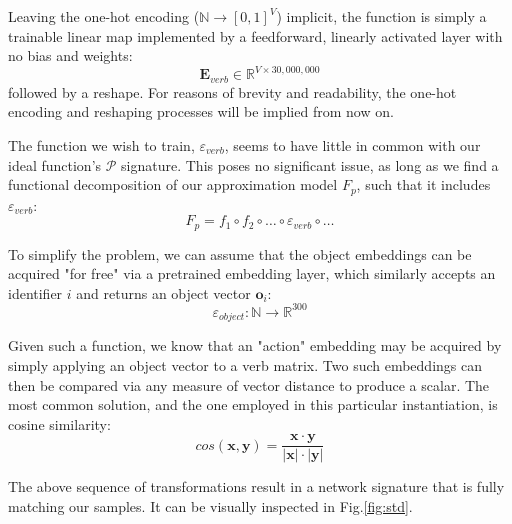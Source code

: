 \documentclass[a4paper,11pt]{article}
\newcommand{\abs}[1]{\lvert #1\rvert}
\begin{document}
Leaving the one-hot encoding ($\mathbb{N} \to [0,1]^V$) implicit, the function is simply a trainable linear map implemented by a feedforward, linearly activated layer with no bias and weights:
\[
\mathbf{E}_{verb}  \in \mathbb{R}^{V \times 30,000,000}
\]
followed by a reshape. For reasons of brevity and readability, the one-hot encoding and reshaping processes will be implied from now on.

The function we wish to train, $\varepsilon_{verb}$, seems to have little in common with our ideal function's $\mathcal{P}$ signature. This poses no significant issue, as long as we find a functional decomposition of our approximation model $F_p$, such that it includes $\varepsilon_{verb}$:
\[
F_p = f_1 \circ f_2 \circ \dots \circ \varepsilon_{verb} \circ \dots
\]

To simplify the problem, we can assume that the object embeddings can be acquired "for free" via a pretrained embedding layer, which similarly accepts an identifier $i$ and returns an object vector $\mathbf{o}_i$:
\[
\varepsilon_{object}: \mathbb{N} \to \mathbb{R}^{300}
\]

Given such a function, we know that an "action" embedding may be acquired by simply applying an object vector to a verb matrix. Two such embeddings can then be compared via any measure of vector distance to produce a scalar. The most common solution, and the one employed in this particular instantiation, is cosine similarity:
\[
cos(\mathbf{x}, \mathbf{y}) = \frac{\mathbf{x}\cdot \mathbf{y}}{\abs{\mathbf{x}}\cdot \abs{\mathbf{y}}}
\]

The above sequence of transformations result in a network signature that is fully matching our samples. It can be visually inspected in Fig.\ref{fig:std}.
\\
\end{document}
